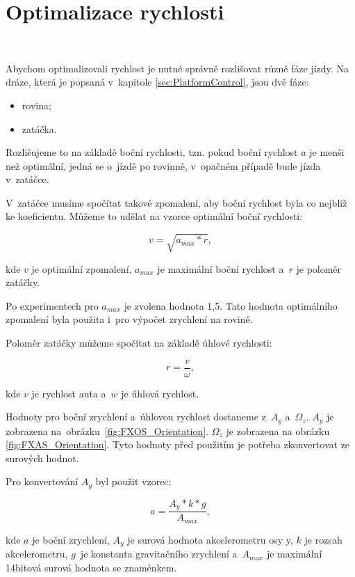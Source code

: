 \chapter{Optimalizace rychlosti}
\label{sec:SpeedOptimization}\

Abychom optimalizovali rychlost je nutné správně rozlišovat různé fáze jízdy. Na
dráze, která je popsaná v~kapitole \ref{sec:PlatformControl}, jsou dvě fáze:

\begin{itemize}
	\item{rovina;}
	\item{zatáčka.}
\end{itemize}

Rozlišujeme to na základě boční rychlosti, tzn. pokud boční rychlost $a$ je menši 
než optimální, jedná se o~jízdě po rovinně, v~opačném případě bude jízda v~zatáčce.

V~zatáčce musíme spočítat takové zpomalení, aby boční rychlost byla co nejblíž 
ke koeficientu. Můžeme to udělat na vzorce optimální boční rychlosti:

\begin{equation}
v = \sqrt{a_{max} * r},
\end{equation}

kde $v$ je optimální zpomalení, $a_{max}$ je maximální boční rychlost a~$r$ je 
poloměr zatáčky. 

Po experimentech pro $a_{max}$ je zvolena hodnota 1,5. Tato hodnota optimálního 
zpomalení byla použita i~pro výpočet zrychlení na rovině. 

Poloměr zatáčky můžeme spočítat na základě úhlové rychlosti:

\begin{equation}
r = \frac{v}{\omega},
\end{equation}

kde $v$ je rychlost auta a~$w$ je úhlová rychlost.

Hodnoty pro boční zrychlení a~úhlovou rychlost dostaneme z~$A_y$ a~$\Omega_z$. 
$A_y$ je zobrazena na~obrázku~\ref{fig:FXOS_Orientation}.  $\Omega_z$ je zobrazena 
na obrázku \ref{fig:FXAS_Orientation}. Tyto hodnoty před použitím je potřeba 
zkonvertovat ze surových hodnot.

Pro konvertování $A_y$ byl použit vzorec:

\begin{equation}
a = \frac{A_y * k * g}{A_{max}},
\end{equation}

kde $a$ je boční zrychlení, $A_y$ je surová hodnota akcelerometru osy y,
$k$ je rozsah akcelerometru,  $g$~je konstanta gravitačního zrychlení a~$A_{max}$ 
je maximální 14bitová surová hodnota se znaménkem.

